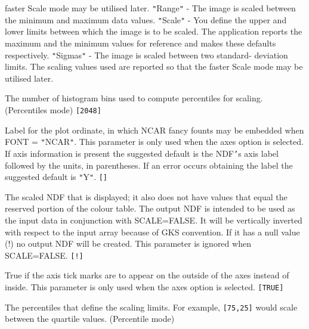 \documentclass[twoside,11pt]{article}
\newcommand{\sstsubsection}[1]{ \item[{#1}] \mbox{} \\}
\renewcommand{\sstsubsection}[1]{\item[{#1}]}
\begin{document}
{{{                           faster Scale mode may be utilised later.
           {\tt "}Range{\tt "}       - The image is scaled between the minimum and
                           maximum data values.
           {\tt "}Scale{\tt "}       - You define the upper and lower limits
                           between which the image is to be scaled.  The
                           application reports the maximum and the
                           minimum values for reference and makes these
                           defaults respectively.
           {\tt "}Sigmas{\tt "}      - The image is scaled between two standard-
                           deviation limits.  The scaling values used
                           are reported so that the faster Scale mode
                           may be utilised later.
      }
      \sstsubsection{
         NUMBIN  =  \_INTEGER (Read)
      }{
         The number of histogram bins used to compute percentiles for
         scaling. (Percentiles mode) {\tt [2048]}
      }
      \sstsubsection{
         ORDLAB  =  LITERAL (Read)
      }{
         Label for the plot ordinate, in which NCAR fancy founts
         may be embedded when FONT = {\tt "}NCAR{\tt "}.   This parameter is only
         used when the axes option is selected.  If axis information is
         present the suggested default is the NDF{\tt '}s axis label followed
         by the units, in parentheses.  If an error occurs obtaining
         the label the suggested default is {\tt "}Y{\tt "}. {\tt []}
      }
      \sstsubsection{
         OUT = NDF (Write)
      }{
         The scaled NDF that is displayed; it also does not have
         values that equal the reserved portion of the colour table.
         The output NDF is intended to be used as the input data in
         conjunction with SCALE=FALSE.  It will be vertically
         inverted with respect to the input array because of GKS
         convention.  If it has a null value (!) no output NDF will be
         created.  This parameter is ignored when SCALE=FALSE. {\tt [!]}
      }
      \sstsubsection{
         OUTTIC = \_LOGICAL (Read)
      }{
         True if the axis tick marks are to appear on the outside of
         the axes instead of inside.   This parameter is only used
         when the axes option is selected. {\tt [TRUE]}
      }
      \sstsubsection{
         PERCENTILES( 2 ) = \_REAL (Read)
      }{
         The percentiles that define the scaling limits. For example,
         {\tt [75,25]} would scale between the quartile values. (Percentile
         mode)
      }
      \sstsubsection{
         PLTITL = LITERAL (Read)
}}}
\end{document}
